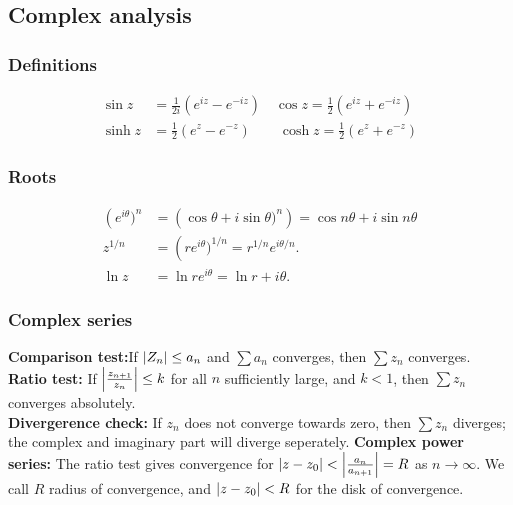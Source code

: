\documentclass[a4paper, 10pt]{article}
\begin{document}
\tiny
\begin{multicols*}{3}
\begin{mdframed}
\subsection*{Complex analysis}
\end{mdframed}
\subsubsection*{Definitions}
\begin{align*}
  \sin{z} &= \frac{1}{2i}\left(e^{iz}-e^{-iz}\right)\quad
  \cos{z} = \frac{1}{2}\left(e^{iz}+e^{-iz}\right)\\
  \sinh{z} &= \frac{1}{2}\left(e^{z}-e^{-z}\right)\qquad
  \cosh{z} = \frac{1}{2}\left(e^{z}+e^{-z}\right)
\end{align*}

\subsubsection*{Roots}
\begin{align*}
  \left(e^{i\theta})^n &= \left(\cos{\theta} + i \sin{\theta})^n\right) = \cos{n\theta} + i\sin{n\theta}\\
  z^{1/n} &= \left(re^{i\theta})^{1/n} = r^{1/n}e^{i\theta/n}.\\
  \ln{z} &= \ln{re^{i\theta}} = \ln{r} + i\theta.
\end{align*}


\subsubsection*{Complex series}
\textbf{Comparison test:}If $\abs{Z_n} \leq a_n$ and $\sum a_n$ converges, then $\sum z_n$ converges.\\
\textbf{Ratio test:} If $\abs{\frac{z_{n+1}}{z_n}} \leq k$ for all $n$ sufficiently large, and $k<1$, then $\sum z_n$ converges absolutely.\\
\textbf{Divergerence check:} If $z_n$ does not converge towards zero, then $\sum z_n$ diverges; the complex and imaginary part will diverge seperately.
\textbf{Complex power series:} The ratio test gives convergence for $\abs{z-z_0} < \abs{\frac{a_n}{a_{n+1}}} = R$ as $n\rightarrow \infty$. We call $R$ radius of convergence, and $\abs{z-z_0} < R$ for the disk of convergence.


\end{multicols*}
\end{document}
